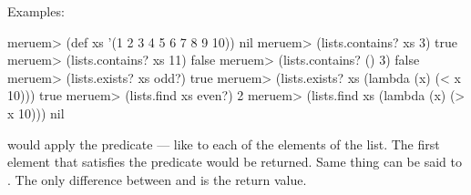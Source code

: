Examples:

\begin{REPL}
meruem> (def xs '(1 2 3 4 5 6 7 8 9 10))
nil
meruem> (lists.contains? xs 3)
true
meruem> (lists.contains? xs 11)
false
meruem> (lists.contains? () 3)
false
meruem> (lists.exists? xs odd?)
true
meruem> (lists.exists? xs (lambda (x) (< x 10)))
true
meruem> (lists.find xs even?)
2
meruem> (lists.find xs (lambda (x) (> x 10)))
nil
\end{REPL}

 would apply the predicate --- like  to each of the elements of the list. The first element that satisfies the predicate would be returned. Same thing can be said to . The only difference between  and  is the return value.
